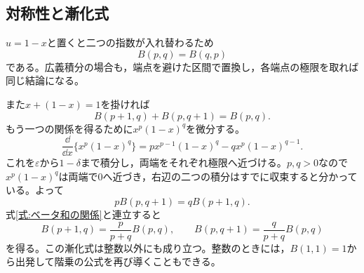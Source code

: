 \subsection{対称性と漸化式}

$u=1-x$と置くと二つの指数が入れ替わるため
\begin{equation}\label{式:ベータ対称性}
 B(p,q)=B(q,p)
\end{equation}
である。広義積分の場合も，端点を避けた区間で置換し，各端点の極限を取れば同じ結論になる。

また$x+(1-x)=1$を掛ければ
\begin{equation}\label{式:ベータ和の関係}
 B(p+1,q)+B(p,q+1)=B(p,q).
\end{equation}
もう一つの関係を得るために$x^p(1-x)^q$を微分する。
\[
 \frac{\dd}{\dd x}\{x^p(1-x)^q\}
 =p x^{p-1}(1-x)^q-qx^p(1-x)^{q-1}.
\]
これを$\varepsilon$から$1-\delta$まで積分し，両端をそれぞれ極限へ近づける。$p,q>0$なので$x^p(1-x)^q$は両端で$0$へ近づき，右辺の二つの積分はすでに収束すると分かっている。よって
\[
 pB(p,q+1)=qB(p+1,q).
\]
式\eqref{式:ベータ和の関係}と連立すると
\begin{equation}\label{式:ベータ漸化式}
 B(p+1,q)=\frac{p}{p+q}B(p,q),\qquad
 B(p,q+1)=\frac{q}{p+q}B(p,q)
\end{equation}
を得る。この漸化式は整数以外にも成り立つ。整数のときには，$B(1,1)=1$から出発して階乗の公式を再び導くこともできる。

